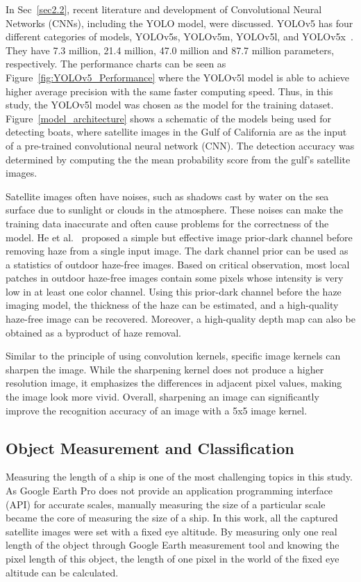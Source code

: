 In Sec~\ref{sec2.2}, recent literature and development of Convolutional Neural Networks (CNNs), including the YOLO model, were discussed. YOLOv5 has four different categories of models, YOLOv5s, YOLOv5m, YOLOv5l, and YOLOv5x~\cite{glenn_jocher_2022_6222936}. They have 7.3 million, 21.4 million, 47.0 million and 87.7 million parameters, respectively. The performance charts can be seen as Figure~\ref{fig:YOLOv5_Performance} where the YOLOv5l model is able to achieve higher average precision with the same faster computing speed. Thus, in this study, the YOLOv5l model was chosen as the model for the training dataset. Figure~\ref{model_architecture} shows a schematic of the models being used for detecting boats, where satellite images in the Gulf of California are as the input of a pre-trained convolutional neural network (CNN). The detection accuracy was determined by computing the the mean probability score from the gulf's satellite images.

Satellite images often have noises, such as shadows cast by water on the sea surface due to sunlight or clouds in the atmosphere. These noises can make the training data inaccurate and often cause problems for the correctness of the model. He et al.~\cite{He2009SingleIH} proposed a simple but effective image prior-dark channel before removing haze from a single input image. The dark channel prior can be used as a statistics of outdoor haze-free images. Based on critical observation, most local patches in outdoor haze-free images contain some pixels whose intensity is very low in at least one color channel. Using this prior-dark channel before the haze imaging model, the thickness of the haze can be estimated, and a high-quality haze-free image can be recovered. Moreover, a high-quality depth map can also be obtained as a byproduct of haze removal.

Similar to the principle of using convolution kernels, specific image kernels can sharpen the image. While the sharpening kernel does not produce a higher resolution image, it emphasizes the differences in adjacent pixel values, making the image look more vivid. Overall, sharpening an image can significantly improve the recognition accuracy of an image with a 5x5 image kernel.

\subsection{Object Measurement and Classification}
Measuring the length of a ship is one of the most challenging topics in this study. As Google Earth Pro does not provide an application programming interface (API) for accurate scales, manually measuring the size of a particular scale became the core of measuring the size of a ship. In this work, all the captured satellite images were set with a fixed eye altitude. By measuring only one real length of the object through Google Earth measurement tool and knowing the pixel length of this object, the length of one pixel in the world of the fixed eye altitude can be calculated.

